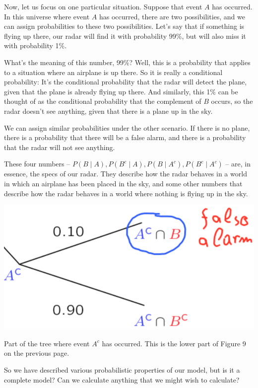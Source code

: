 \documentclass{tufte-handout}
\begin{document}
Now, let us focus on one particular situation. Suppose that event $A$ has occurred. 
In this universe where event $A$ has occurred, there are two possibilities, and we can assign probabilities to
these two possibilities. Let's say that if something is flying up there, our radar will find it with
probability 99\%, but will also miss it with probability 1\%. 

What's the meaning of this number, 99\%? Well, this is a probability that applies to a situation where an
airplane is up there. So it is really a conditional probability: It's the conditional probability that the radar 
will detect the plane, given that the plane is already flying up there. And
similarly, this 1\% can be thought of as the conditional probability that the complement of $B$ occurs, so
the radar doesn't see anything, given that there is a plane up in the sky.


We can assign similar probabilities under the other scenario. If there is no plane, there is a probability
that there will be a false alarm, and there is a probability that the radar will not see anything. 

These four
numbers  -- $P(B \mid A), P(B^c \mid A),  P(B \mid A^c), P(B^c \mid A^c)$ -- are, in essence, the specs of our radar. 
They describe how the radar behaves in a world
in which an airplane has been placed in the sky, and some other numbers that describe how the radar
behaves in a world where nothing is flying up in the sky.

\begin{marginfigure}
  \includegraphics{AirplaneTreePart2}
  \caption{Part of the tree where event $A^c$ has occurred. This is the lower part of Figure 9 on the previous page.}
\end{marginfigure}


\vspace{0.3cm}
So we have described various probabilistic properties of our model, but is it a complete model? Can we
calculate anything that we might wish to calculate? 
\end{document}
